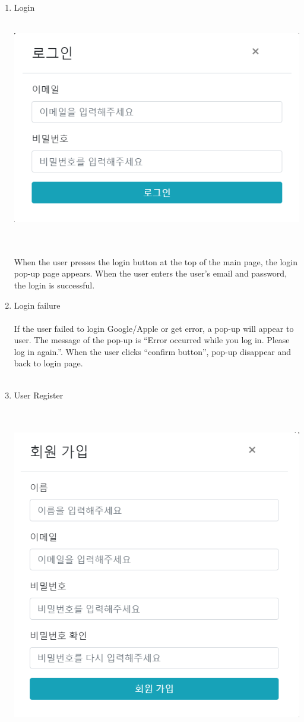 \documentclass[conference]{IEEEtran}
\begin{document}
\begin{enumerate}
\item{Login}
\\\\\centerline{\includegraphics[scale=0.6]{pics/login.png}}
\\\\When the user presses the login button at the top of the main page, the login pop-up page appears. When the user enters the user's email and password, the login is successful.\\
\item{Login failure}\\
\\If the user failed to login Google/Apple or get error, a pop-up will appear to user. The message of the pop-up is “Error occurred while you log in. Please log in again.”. When the user clicks “confirm button”, pop-up disappear and back to login page.\\\\
\item{User Register}\\\\
\\\centerline{\includegraphics[scale=0.6]{pics/register.png}}\\

\end{enumerate}
\end{document}
